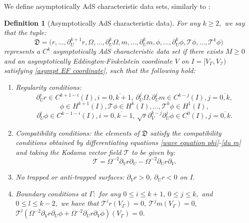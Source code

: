 \documentclass[11pt]{article}
\newtheorem{definition}{Definition}[section]
\numberwithin{equation}{section}
\begin{document}
We define asymptotically AdS characteristic data sets, similarly to \cite[Definition 3.3]{localwellposed}:
\begin{definition}[Asymptotically AdS characteristic data]\label{asympt ads data def}
    For any $k\geq2,$ we say that the tuple:
    \[\mathfrak{D}=\big(r,\ldots,\partial_U^{k+1}r,\Omega,\ldots,\partial_U^k\Omega,m,\ldots,\partial_U^km,\phi,\ldots,\partial_U^k\phi,\mathcal{T}\phi,\ldots,\mathcal{T}^k\phi\big)\]
    represents a $C^k$ asymptotically AdS characteristic data set if there exists $M\geq0$ and an asymptotically Eddington-Finkelstein coordinate $V$ on $I=\big[V_{\Gamma},V_{\mathcal{I}}\big)$ satisfying \eqref{asympt EF coordinate}, such that the following hold:
    \begin{enumerate}
        \item Regularity conditions:
        \begin{equation}\label{regularity conditions geometry}
            \partial_U^{i}r\in C^{k+1-i}(I),i=\overline{0,k+1},\ \partial_U^{j}\Omega,\partial_U^{j}m\in C^{k-j}(I),j=\overline{0,k},
        \end{equation}
        \begin{equation}\label{regularity conditions scalar field L2}
            \phi\in H^{k+1}(I),\mathcal{T}\phi\in H^{k}(I),\ldots,\mathcal{T}^k\phi\in H^1(I),
        \end{equation}
        \begin{equation}\label{regularity conditions pointwise}
            \partial_U^i\phi\in C^{k-1-i}(I),i=\overline{0,k-1},\ \sqrt{r}\partial_V^{k-j}\partial_U^j\phi\in C^0(I),j=\overline{0,k}.
        \end{equation}
        \item Compatibility conditions: the elements of $\mathfrak{D}$ satisfy the compatibility conditions obtained by differentiating equations \eqref{wave equation phi}-\eqref{du m} and taking the Kodama vector field $\mathcal{T}$ to be given by:
            \begin{equation}\label{definition of T}
                \mathcal{T}=\Omega^{-2}\partial_Vr\partial_U-\Omega^{-2}\partial_Ur\partial_V.
            \end{equation}
        \item No trapped or anti-trapped surfaces: $\partial_Vr>0,\ \partial_Ur<0$ on $I.$
        \item Boundary conditions at $\Gamma:$ for any $0\leq i\leq k+1,\ 0\leq j\leq k,$ and $0\leq l\leq k-2,$ we have that $\mathcal{T}^ir(V_{\Gamma})=0,\ \mathcal{T}^jm(V_{\Gamma})=0,$ $\mathcal{T}^l(\Omega^{-2}\partial_Vr\partial_U\phi+\Omega^{-2}\partial_Ur\partial_V\phi)(V_{\Gamma})=0.$ 

\end{enumerate}
\end{definition}
\end{document}
